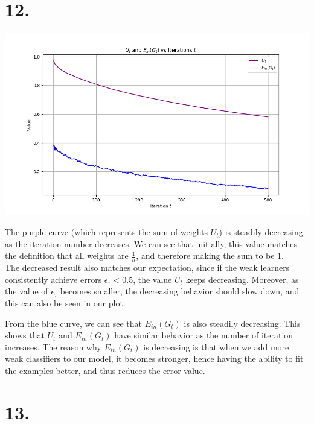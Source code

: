 \documentclass{article}
\begin{document}
\newpage

\section*{12.}

\includegraphics[width = \textwidth, height = \textheight, keepaspectratio]{12_result_1112.png}

The purple curve (which represents the sum of weights $U_t$) is steadily decreasing as the iteration number decreases.
We can see that initially, this value matches the definition that all weights are $\frac{1}{n}$, and therefore making the sum to be $1$. \\

The decreased result also matches our expectation, since if the weak learners consistently achieve errors $ \epsilon_{\tau} < 0.5$, 
the value $U_t$ keeps decreasing. 
Moreover, as the value of $\epsilon_{\tau}$ becomes smaller, the decreasing behavior should slow down,
and this can also be seen in our plot.
\newline

From the blue curve, we can see that $E_{in}(G_t)$ is also steadily decreasing.
This shows that $U_t$ and $E_{in}(G_t)$ have similar behavior as the number of iteration increases.
The reason why $E_{in}(G_t)$ is decreasing is that when we add more weak classifiers to our model, 
it becomes stronger, hence having the ability to fit the examples better, and thus reduces the error value.  

\newpage

\section*{13.}
\end{document}
